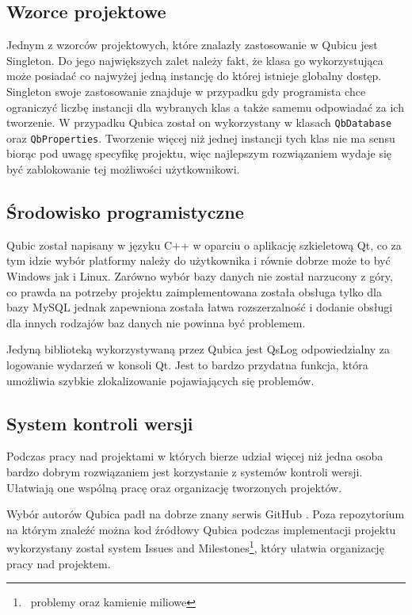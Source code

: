 \documentclass[12pt]{report}
\begin{document}
\subsection{Wzorce projektowe}

Jednym z wzorców projektowych, które znalazły zastosowanie w Qubicu jest Singleton. Do jego największych zalet należy fakt, że klasa go wykorzystująca może posiadać 
co najwyżej jedną instancję do której istnieje globalny dostęp. Singleton swoje zastosowanie znajduje w przypadku gdy programista chce ograniczyć liczbę instancji dla 
wybranych klas a także samemu odpowiadać za ich tworzenie. W przypadku Qubica został on wykorzystany w klasach {\tt QbDatabase} oraz {\tt QbProperties}. Tworzenie 
więcej niż jednej instancji tych klas nie ma sensu biorąc pod uwagę specyfikę projektu, więc najlepszym rozwiązaniem wydaje się być zablokowanie tej możliwości użytkownikowi. 

\subsection{Środowisko programistyczne}

Qubic został napisany w języku C++ w oparciu o aplikację szkieletową Qt, co za tym idzie wybór platformy należy do użytkownika i równie dobrze może to być Windows jak i Linux.
Zarówno wybór bazy danych nie został narzucony z góry, co prawda na potrzeby projektu zaimplementowana została obsługa tylko dla bazy MySQL jednak zapewniona została 
łatwa rozszerzalność i dodanie obsługi dla innych rodzajów baz danych nie powinna być problemem.

Jedyną biblioteką wykorzystywaną przez Qubica jest QsLog \cite{qslog} odpowiedzialny za logowanie wydarzeń w konsoli Qt. Jest to bardzo przydatna funkcja, która umożliwia
szybkie zlokalizowanie pojawiających się problemów.

\subsection{System kontroli wersji}

Podczas pracy nad projektami w których bierze udział więcej niż jedna osoba bardzo dobrym rozwiązaniem jest korzystanie z systemów kontroli wersji. Ułatwiają one wspólną
pracę oraz organizację tworzonych projektów.

Wybór autorów Qubica padł na dobrze znany serwis GitHub \cite{github}. Poza repozytorium na którym znaleźć można kod źródłowy Qubica podczas implementacji projektu
wykorzystany został system Issues and Milestones\footnote{~problemy oraz kamienie miliowe}, który ułatwia organizację pracy nad projektem.
\end{document}
